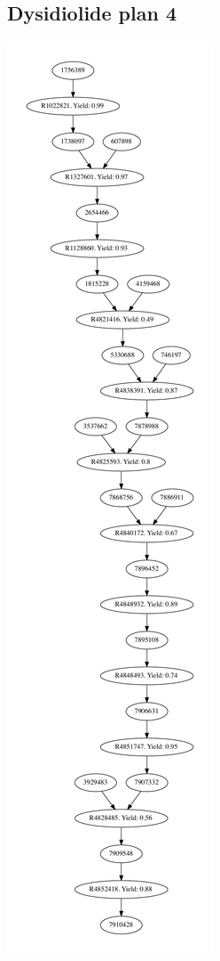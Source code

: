 \documentclass[a4paper,10pt,titlepage]{paper}
\begin{document}
\subsection{Dysidiolide plan 4}
\centering
\includegraphics[scale=0.4]{Synteseplaner/Dysidiolide/plan4.pdf}
\label{Appendix::Dysidiolide4}
\end{document}
